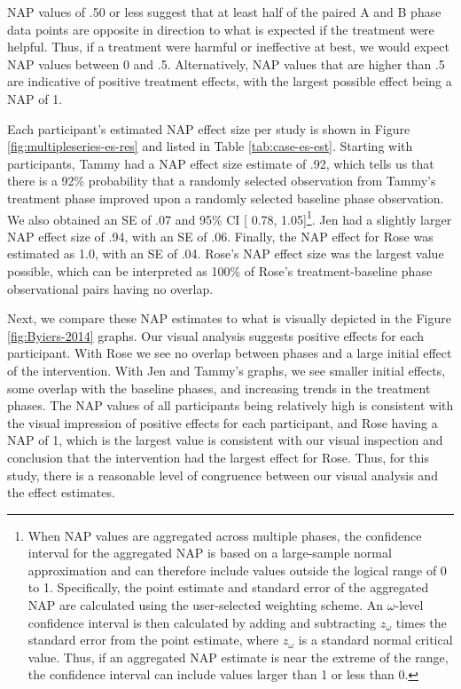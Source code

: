 \documentclass[
]{book}
\begin{document}
NAP values of .50 or less suggest that at least half of the paired A and B phase data points are opposite in direction to what is expected if the treatment were helpful. Thus, if a treatment were harmful or ineffective at best, we would expect NAP values between 0 and .5. Alternatively, NAP values that are higher than .5 are indicative of positive treatment effects, with the largest possible effect being a NAP of 1.

Each participant's estimated NAP effect size per study is shown in Figure \ref{fig:multipleseries-es-res} and listed in Table \ref{tab:case-es-est}. Starting with \citet{Byiers2014} participants, Tammy had a NAP effect size estimate of .92, which tells us that there is a 92\% probability that a randomly selected observation from Tammy's treatment phase improved upon a randomly selected baseline phase observation. We also obtained an SE of .07 and 95\% CI {[} 0.78, 1.05{]}\footnote{When NAP values are aggregated across multiple phases, the confidence interval for the aggregated NAP is based on a large-sample normal approximation and can therefore include values outside the logical range of 0 to 1. Specifically, the point estimate and standard error of the aggregated NAP are calculated using the user-selected weighting scheme. An \(\omega\)-level confidence interval is then calculated by adding and subtracting \(z_\omega\) times the standard error from the point estimate, where \(z_\omega\) is a standard normal critical value. Thus, if an aggregated NAP estimate is near the extreme of the range, the confidence interval can include values larger than 1 or less than 0.}. Jen had a slightly larger NAP effect size of .94, with an SE of .06. Finally, the NAP effect for Rose was estimated as 1.0, with an SE of .04. Rose's NAP effect size was the largest value possible, which can be interpreted as 100\% of Rose's treatment-baseline phase observational pairs having no overlap.

Next, we compare these NAP estimates to what is visually depicted in the Figure \ref{fig:Byiers-2014} graphs. Our visual analysis suggests positive effects for each participant. With Rose we see no overlap between phases and a large initial effect of the intervention. With Jen and Tammy's graphs, we see smaller initial effects, some overlap with the baseline phases, and increasing trends in the treatment phases. The NAP values of all participants being relatively high is consistent with the visual impression of positive effects for each participant, and Rose having a NAP of 1, which is the largest value is consistent with our visual inspection and conclusion that the intervention had the largest effect for Rose. Thus, for this study, there is a reasonable level of congruence between our visual analysis and the effect estimates.
\end{document}
